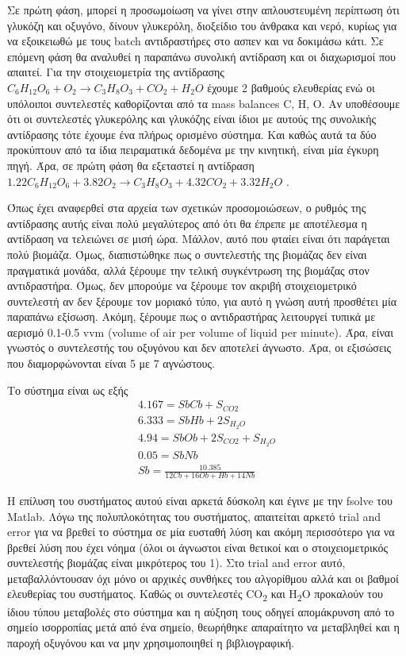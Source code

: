 \documentclass[11pt]{article}
\begin{document}
Σε πρώτη φάση, μπορεί η προσωμοίωση να γίνει στην απλουστευμένη περίπτωση ότι γλυκόζη και οξυγόνο, δίνουν γλυκερόλη, διοξείδιο του άνθρακα και νερό, κυρίως για να εξοικειωθώ με τους batch αντιδραστήρες στο ασπεν και να δοκιμάσω κάτι. Σε επόμενη φάση θα αναλυθεί η παραπάνω συνολική αντίδραση και οι διαχωρισμοί που απαιτεί. Για την στοιχειομετρία της αντίδρασης \(C_6H_{12}O_6 + O_2 \rightarrow C_3H_8O_3 + CO_2 +H_2O\) έχουμε 2 βαθμούς ελευθερίας ενώ οι υπόλοιποι συντελεστές καθορίζονται από τα mass balances C, H, O. Αν υποθέσουμε ότι οι συντελεστές γλυκερόλης και γλυκόζης είναι ίδιοι με αυτούς της συνολικής αντίδρασης τότε έχουμε ένα πλήρως ορισμένο σύστημα. Και καθώς αυτά τα δύο προκύπτουν από τα ίδια πειραματικά δεδομένα με την κινητική, είναι μία έγκυρη πηγή. Άρα, σε πρώτη φάση θα εξεταστεί η αντίδραση
\(1.22 C_6H_{12}O_6 + 3.82O_2 \rightarrow C_3H_8O_3 + 4.32CO_2 + 3.32H_2O\) .

Όπως έχει αναφερθεί στα αρχεία των σχετικών προσομοιώσεων, ο ρυθμός της αντίδρασης αυτής είναι πολύ μεγαλύτερος από ότι θα έπρεπε με αποτέλεσμα η αντίδραση να τελειώνει σε μισή ώρα. Μάλλον, αυτό που φταίει είναι ότι παράγεται πολύ βιομάζα. Όμως, διαπιστώθηκε πως ο συντελεστής της βιομάζας δεν είναι πραγματικά μονάδα, αλλά ξέρουμε την τελική συγκέντρωση της βιομάζας στον αντιδραστήρα. Όμως, δεν μπορούμε να ξέρουμε τον ακριβή στοιχειομετρικό συντελεστή αν δεν ξέρουμε τον μοριακό τύπο, για αυτό η γνώση αυτή προσθέτει μία παραπάνω εξίσωση. Ακόμη, ξέρουμε πως ο αντιδραστήρας λειτουργεί τυπικά με αερισμό 0.1-0.5 vvm (volume of air per volume of liquid per minute). Άρα, είναι γνωστός ο συντελεστής του οξυγόνου και δεν αποτελεί άγνωστο. Άρα, οι εξισώσεις που διαμορφώνονται είναι 5 με 7 αγνώστους.

Το σύστημα είναι ως εξής
\begin{align*}
4.167 = SbCb + S_{CO2} \\ 6.333 = SbHb + 2S_{H_2O} \\ 4.94 = SbOb + 2S_{CO2} + S_{H_2O} \\ 0.05 = SbNb \\ Sb = \frac{10.385}{12Cb+16Ob+Hb+14Nb}
\end{align*} 

Η επίλυση του συστήματος αυτού είναι αρκετά δύσκολη και έγινε με την fsolve του Matlab. Λόγω της πολυπλοκότητας του συστήματος, απαιτείται αρκετό trial and error για να βρεθεί το σύστημα σε μία ευσταθή λύση και ακόμη περισσότερο για να βρεθεί λύση που έχει νόημα (όλοι οι άγνωστοι είναι θετικοί και ο στοιχειομετρικός συντελεστής βιομάζας είναι μικρότερος του 1). Στο trial and error αυτό, μεταβαλλόντουσαν όχι μόνο οι αρχικές συνθήκες του αλγορίθμου αλλά και οι βαθμοί ελευθερίας του συστήματος. Καθώς οι συντελεστές CO\textsubscript{2} και H\textsubscript{2}O προκαλούν του ίδιου τύπου μεταβολές στο σύστημα και η αύξηση τους οδηγεί απομάκρυνση από το σημείο ισορροπίας μετά από ένα σημείο, θεωρήθηκε απαραίτητο να μεταβληθεί και η παροχή οξυγόνου και να μην χρησιμοποιηθεί η βιβλιογραφική.
\end{document}
